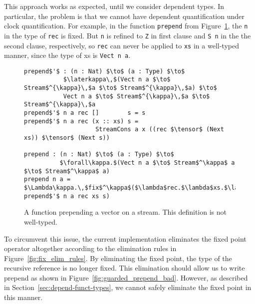 
This approach works as expected, until we consider dependent types. In
particular, the problem is that we cannot have dependent quantification under
clock quantification. For example, in the function \texttt{prepend} from
Figure~\ref{fig:guarded_prepend}, the \texttt{n} in the type of \texttt{rec} is
fixed. But \texttt{n} is refined to \texttt{Z} in first clause and \texttt{S n}
in the the second clause, respectively, so \texttt{rec} can never be applied to
\texttt{xs} in a well-typed manner, since the type of xs is \texttt{Vect n a}.

\begin{figure}[h]
\begin{lstlisting}[mathescape,title=\ttBlock]
prepend$'$ : (n : Nat) $\to$ (a : Type) $\to$
           $\laterkappa\,$(Vect n a $\to$ Stream$^{\kappa}\,$a $\to$ Stream$^{\kappa}\,$a) $\to$ 
           Vect n a $\to$ Stream$^{\kappa}\,$a $\to$ Stream$^{\kappa}\,$a
prepend$'$ n a rec []        s = s 
prepend$'$ n a rec (x :: xs) s = 
                    StreamCons a x ((rec $\tensor$ (Next xs)) $\tensor$ (Next s))

prepend : (n : Nat) $\to$ (a : Type) $\to$ 
          $\forall\kappa.$(Vect n a $\to$ Stream$^\kappa$ a $\to$ Stream$^\kappa$ a)
prepend n a = $\Lambda\kappa.\,$fix$^\kappa$($\lambda$rec.$\lambda$xs.$\lambda$s. prepend$'$ n a rec xs s)
\end{lstlisting}
  \caption{A function prepending a vector on a stream. This definition is not well-typed.}
  \label{fig:guarded_prepend}
\end{figure}

To circumvent this issue, the current implementation eliminates the fixed point operator altogether according
to the elimination rules in Figure~\ref{fig:fix_elim_rules}. By eliminating the
fixed point, the type of the recursive reference is no longer fixed. This
elimination should allow us to write prepend as shown in
Figure~\ref{fig:guarded_prepend_bad}. However, as described in
Section~\ref{sec:depend-funct-types}, we cannot safely eliminate the fixed point
in this manner.


